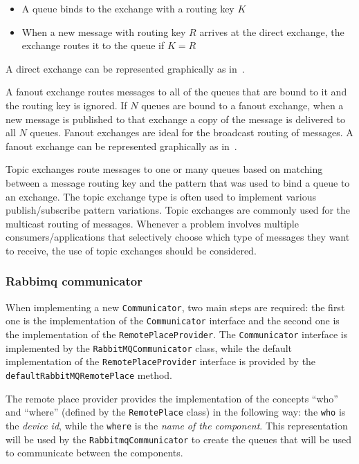 \begin{itemize}
	\item A queue binds to the exchange with a routing key $K$
	\item When a new message with routing key $R$ arrives at the direct exchange, the exchange routes it to the queue if $K = R$
\end{itemize}

A direct exchange can be represented graphically as in~.

A fanout exchange routes messages to all of the queues that are bound to it and the routing key is ignored. If $N$ queues are bound to a fanout
exchange, when a new message is published to that exchange a copy of the message is delivered to all $N$ queues. Fanout exchanges are ideal for the
broadcast routing of messages. A fanout exchange can be represented graphically as in~.

Topic exchanges route messages to one or many queues based on matching between a message routing key and the pattern that was used to bind a queue to
an exchange. The topic exchange type is often used to implement various publish/subscribe pattern variations. Topic exchanges are commonly used for
the multicast routing of messages. Whenever a problem involves multiple consumers/applications that selectively choose which type of messages they
want to receive, the use of topic exchanges should be considered.

\subsubsection{Rabbimq communicator}


When implementing a new \texttt{Communicator}, two main steps are required: the first one is the implementation of the \texttt{Communicator} interface
and the second one is the implementation of the \texttt{RemotePlaceProvider}.
The \texttt{Communicator} interface is implemented by the \texttt{RabbitMQCommunicator} class, while the default implementation of the
\texttt{RemotePlaceProvider} interface is provided by the \texttt{default\-RabbitMQ\-Remote\-Place} method.

The remote place provider provides the implementation of the concepts ``who'' and ``where'' (defined by the \texttt{RemotePlace} class) in the
following way: the \texttt{who} is the \emph{device id}, while the \texttt{where} is the \emph{name of the component}.
This representation will be used by the \texttt{RabbitmqCommunicator} to create the queues that will be used to communicate between the components.

